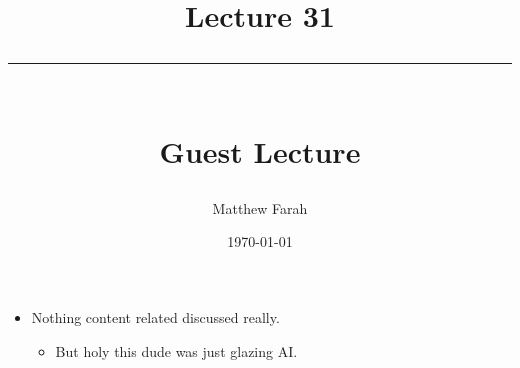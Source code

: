 \documentclass{article}
\date{
	\vspace{-.75em}
	{\large \today}
}
\title{
	\vspace*{-1.5em}
	{\Huge Lecture 31} \\
	\vspace{-1em}
	\rule{\textwidth/4}{.01em} \\
	\vspace{-.25em}
	{\Large Guest Lecture}
	\vspace{-.75em}
}
\author{
	{\large Matthew Farah}
}
\begin{document}
\maketitle
\pagestyle{fancy}

\fi


\begin{itemize}
	\item Nothing content related discussed really.
	\begin{itemize}
		\item But holy this dude was just glazing AI.
	\end{itemize}
\end{itemize}

\ifdefined\iscombined
	\newpage
\else
	
\end{document}

